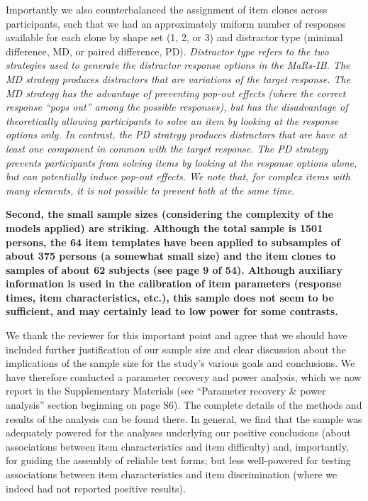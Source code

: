 \documentclass[a4paper,notitlepage,12pt]{article}
\begin{document}
\begin{displayquote}
Importantly we also counterbalanced the assignment of item clones across participants, such that we had an approximately uniform number of responses available for each clone by shape set (1, 2, or 3) and distractor type (minimal difference, MD, or paired difference, PD). \textit{Distractor type refers to the two strategies used to generate the distractor response options in the MaRs-IB. The MD strategy produces distractors that are variations of the target response. The MD strategy has the advantage of preventing pop-out effects (where the correct response ``pops out'' among the possible responses), but has the disadvantage of theoretically allowing participants to solve an item by looking at the response options only. In contrast, the PD strategy produces distractors that are have at least one component in common with the target response. The PD strategy prevents participants from solving items by looking at the response options alone, but can potentially induce pop-out effects. We note that, for complex items with many elements, it is not possible to prevent both at the same time.}
\end{displayquote}


\textbf{Second, the small sample sizes (considering the complexity of the models applied) are striking. Although the total sample is 1501 persons, the 64 item templates have been applied to subsamples of about 375 persons (a somewhat small size) and the item clones to samples of about 62 subjects (see page 9 of 54). Although auxiliary information is used in the calibration of item parameters (response times, item characteristics, etc.), this sample does not seem to be sufficient, and may certainly lead to low power for some contrasts.}

We thank the reviewer for this important point and agree that we should have included further justification of our sample size and clear discussion about the implications of the sample size for the study's various goals and conclusions. We have therefore conducted a parameter recovery and power analysis, which we now report in the Supplementary Materials (see ``Parameter recovery \& power analysis'' section beginning on page S6). The complete details of the methods and results of the analysis can be found there. In general, we find that the sample was adequately powered for the analyses underlying our positive conclusions (about associations between item characteristics and item difficulty) and, importantly, for guiding the assembly of reliable test forms; but less well-powered for testing associations between item characteristics and item discrimination (where we indeed had not reported positive results).
\end{document}

